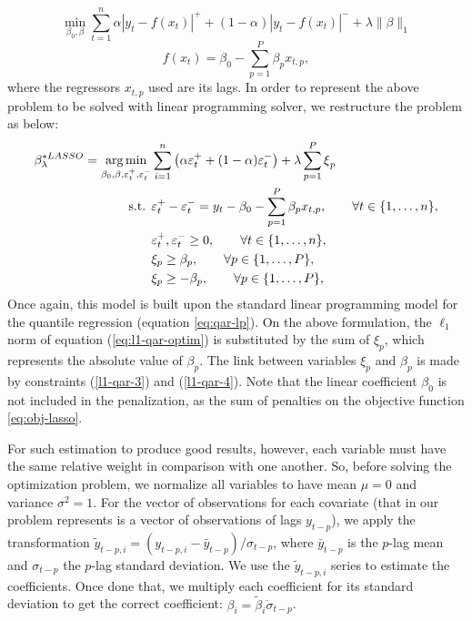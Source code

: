 \begin{equation}
\min_{\beta_{0},\beta}\sum_{t=1}^{n}\alpha|y_{t}-f(x_t)|^{+}+(1-\alpha)|y_{t}-f(x_t)|^{-}+\lambda\|\beta\|_{1}
\label{eq:l1-qar-optim}
\end{equation}
\[
f(x_t)=\beta_{0}-\sum_{p=1}^{P}\beta_{p}x_{t,p},
\]
where the regressors $x_{t,p}$ used are its lags. In order to represent the above problem to be solved with linear programming solver, we restructure the problem as below:
\begin{eqnarray}
\beta_\lambda^{*LASSO} = \operatorname*{arg\,min}_{\beta_{0},\beta,\varepsilon_{t}^{+},\varepsilon_{t}^{-}} & \sum_{i=1}^{n}\left(\alpha\varepsilon_{t}^{+}+(1-\alpha)\varepsilon_{t}^{-}\right)+\lambda\sum_{p=1}^{P}\mbox{\ensuremath{\xi}}_{p} \label{eq:obj-lasso} \\
\mbox{s.t. } & \varepsilon_{t}^{+}-\varepsilon_{t}^{-}=y_{t}-\beta_{0}-\sum_{p=1}^{P}\beta_{p}x_{t,p},\qquad\forall t\in\{1,\dots,n\},\\
 & \varepsilon_{t}^{+},\varepsilon_{t}^{-}\geq0,\qquad\forall t \in \{1,\dots,n\},\\
 & \xi_{p}\geq\beta_{p},\qquad\forall p\in\{1,\dots,P\}, \label{l1-qar-3}\\
 & \xi_{p}\geq-\beta_{p},\qquad\forall p\in\{1,\dots,P\}, \label{l1-qar-4}
\end{eqnarray}
Once again, this model is built upon the standard linear programming model for the quantile regression (equation \ref{eq:qar-lp}). 
On the above formulation, the $\ell_1$ norm of equation (\ref{eq:l1-qar-optim}) is substituted by the sum of $\xi_p$, which represents the absolute value of $\beta_p$. The link between variables $\xi_p$ and $\beta_p$ is made by constraints (\ref{l1-qar-3}) and (\ref{l1-qar-4}). Note that the linear coefficient $\beta_0$ is not included in the penalization, as the sum of penalties on the objective function \ref{eq:obj-lasso}.

For such estimation to produce good results, however, each variable must have the same relative weight in comparison with one another. So, before solving the optimization problem, we normalize all variables to have mean $\mu = 0$ and variance $\sigma^2 = 1$. For the vector of observations for each covariate (that in our problem represents is a vector of observations of lags $y_{t-p}$), we apply the transformation $\tilde{y}_{t-p,i} = (y_{t-p,i} - \bar{y}_{t-p}) / \sigma_{t-p}$, where $\bar{y}_{t-p}$ is the $p$-lag mean and $\sigma_{t-p}$ the $p$-lag standard deviation. We use the $\tilde{y}_{t-p,i}$ series to estimate the coefficients. Once done that, we multiply each coefficient for its standard deviation to get the correct coefficient: $\beta_i = \tilde{\beta}_i \dot \sigma_{t-p}$.

